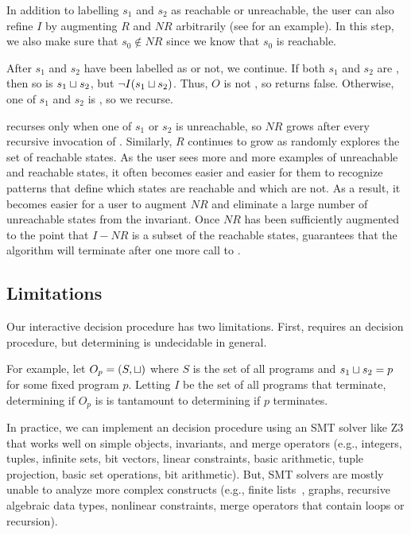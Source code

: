 In addition to labelling $s_1$ and $s_2$ as reachable or unreachable, the user
can also refine $I$ by augmenting $R$ and $NR$ arbitrarily (see
 for an example). In this step, we also make
sure that $s_0 \notin NR$ since we know that $s_0$ is reachable.

After $s_1$ and $s_2$ have been labelled as \sTIreachable{} or not, we
continue. If both $s_1$ and $s_2$ are \sTIreachable{}, then so is $s_1 \sqcup
s_2$, but $\lnot I(s_1 \sqcup s_2)$. Thus, $O$ is not \sTIconfluent{}, so
\Helper{} returns false. Otherwise, one of $s_1$ and $s_2$ is
\sTIunreachable{}, so we recurse.

\Helper{} recurses only when one of $s_1$ or $s_2$ is unreachable, so $NR$
grows after every recursive invocation of \Helper{}. Similarly, $R$ continues
to grow as \Helper{} randomly explores the set of reachable states. As the user
sees more and more examples of unreachable and reachable states, it often becomes
easier and easier for them to recognize patterns that define which states are
reachable and which are not. As a result, it becomes easier for a user to
augment $NR$ and eliminate a large number of unreachable states from the
invariant. Once $NR$ has been sufficiently augmented to the point that $I - NR$
is a subset of the reachable states, 
guarantees that the algorithm will terminate after one more call to \IsIclosed.

\subsection{Limitations}
Our interactive \invariantconfluence{} decision procedure has two
limitations. First,  requires an
\invariantclosure{} decision procedure, but determining \invariantclosure{} is
undecidable in general.
%
\begin{techreport}

  For example, let $O_p = (S, \sqcup)$ where $S$ is the set of all programs and
  $s_1 \sqcup s_2 = p$ for some fixed program $p$. Letting $I$ be the set of all
  programs that terminate, determining if $O_p$ is \Iclosed{} is tantamount to
  determining if $p$ terminates.
\end{techreport}
%
In practice, we can implement an \invariantclosure{} decision procedure using
an SMT solver like Z3 that works well on simple objects, invariants, and merge
operators (e.g., integers, tuples, infinite sets, bit vectors, linear
constraints, basic arithmetic, tuple projection, basic set operations, bit
arithmetic). But, SMT solvers are mostly unable to analyze more complex
constructs (e.g., finite lists~\cite{kroning2009proposal}, graphs, recursive
algebraic data types, nonlinear constraints, merge operators that contain loops
or recursion).


